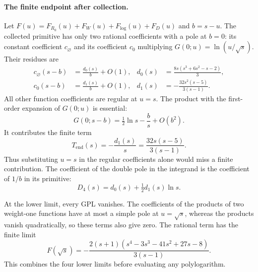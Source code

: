 \paragraph{The finite endpoint after collection.}
Let $F(u)=F_{R_0}(u)+F_W(u)+F_{\log}(u)+F_D(u)$ and
$b=s-u$. The collected primitive has only two rational coefficients
with a pole at $b=0$: its constant coefficient $c_{\varnothing}$ and
its coefficient $c_0$ multiplying $G(0;u)=\ln(u/\sqrt{s})$.
Their residues are
\begin{align}
 c_{\varnothing}(s-b)&=\frac{d_0(s)}b+O(1),
 &d_0(s)&=\frac{8s(s^3+6s^2-s-2)}3,\\
 c_0(s-b)&=\frac{d_1(s)}b+O(1),
 &d_1(s)&=-\frac{32s^2(s-5)}{3(s-1)}.
\end{align}
All other function coefficients are regular at $u=s$.
The product with the first-order expansion of $G(0;u)$ is essential:
\begin{equation}
 G(0;s-b)=\tfrac12\ln s-\frac bs+O(b^2).
\end{equation}
It contributes the finite term
\begin{equation}
 T_{\mathrm{end}}(s)=-\frac{d_1(s)}s
                 =\frac{32s(s-5)}{3(s-1)}.
 \label{eq:comp-real-four-endpoint-Taylor}
\end{equation}
Thus substituting $u=s$ in the regular coefficients alone would miss a
finite contribution. The coefficient of the double pole in the
integrand is the coefficient of $1/b$ in its primitive:
\begin{equation}
 D_4(s)=d_0(s)+\tfrac12d_1(s)\ln s.
 \label{eq:comp-real-four-double-pole}
\end{equation}

At the lower limit, every GPL vanishes. The coefficients of the
products of two weight-one functions have at most a simple pole at
$u=\sqrt{s}$, whereas the products vanish quadratically, so these terms
also give zero. The rational term has the finite limit
\begin{equation}
 F(\sqrt{s})=-\frac{2(s+1)(s^4-3s^3-41s^2+27s-8)}{3(s-1)}.
 \label{eq:comp-real-four-lower-limit}
\end{equation}
This combines the four lower limits before evaluating any polylogarithm.


